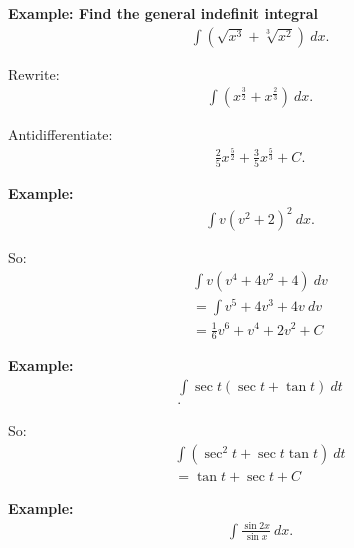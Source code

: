\documentclass{report}
\begin{document}
\bigbreak \noindent 
\begin{mdframed}
  \textbf{Example: Find the general indefinit integral}
  \begin{align*}
    \int (\sqrt{x^{3}} + \sqrt[3]{x^{2}})\ dx
  .\end{align*} 
\end{mdframed}

\bigbreak \noindent \bigbreak \noindent
Rewrite:
\begin{align*}
  \int (x^{\frac{3}{2}} + x^{\frac{2}{3}})\ dx
.\end{align*}

\bigbreak \noindent \bigbreak \noindent
Antidifferentiate:
\begin{align*}
  \boxed{\frac{2}{5}x^{\frac{5}{2}} + \frac{3}{5}x^{\frac{5}{3}} + C}
.\end{align*}

\pagebreak \bigbreak \noindent
\bigbreak \noindent 
\begin{mdframed}
  \textbf{Example: }
  \begin{align*}
    \int v(v^{2} + 2)^{2}\ dx
  .\end{align*}
\end{mdframed}

\bigbreak \noindent
So:
\begin{align*}
  \int v(v^{4}+ 4v^{2} + 4)\ dv \\
  = \int v^{5} + 4v^{3} + 4v\ dv \\
  \boxed{= \frac{1}{6}v^{6}+ v^{4} +2v^{2} + C}
\end{align*}

\bigbreak \noindent 
\begin{mdframed}
  \textbf{Example: }
  \begin{align*}
    \int \sec{t}(\sec{t}+ \tan{t})\ dt \\
  .\end{align*} 
\end{mdframed}

\bigbreak \noindent
So:
\begin{align*}
  \int (\sec^{2}{t} + \sec{t}\tan{t})\ dt \\ 
  \boxed{= \tan{t} + \sec{t} + C}
\end{align*}

\bigbreak \noindent 
\begin{mdframed}
  \textbf{Example: }
  \begin{align*}
    \int \frac{\sin{2x}}{\sin{x}}\ dx
  .\end{align*} 
\end{mdframed}
\end{document}
